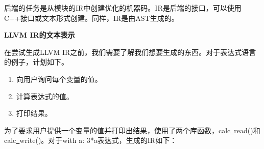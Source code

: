 后端的任务是从模块的IR中创建优化的机器码。IR是后端的接口，可以使用C++接口或文本形式创建。同样，IR是由AST生成的。\par

\hspace*{\fill} \par %
\textbf{LLVM IR的文本表示}

在尝试生成LLVM IR之前，我们需要了解我们想要生成的东西。对于表达式语言的例子，计划如下。


\begin{enumerate}
	\item 向用户询问每个变量的值。
	\item 计算表达式的值。
	\item 打印结果。
\end{enumerate}

为了要求用户提供一个变量的值并打印出结果，使用了两个库函数，calc\underline{~}read()和calc\underline{~}write()。对于with a: 3*a表达式，生成的IR如下：\par


